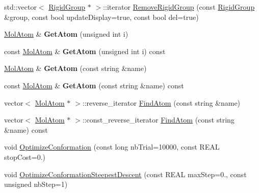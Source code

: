 \begin{DoxyCompactItemize}
std\+::vector$<$ \mbox{\hyperlink{class_obj_cryst_1_1_rigid_group}{Rigid\+Group}} $\ast$ $>$\+::iterator \mbox{\hyperlink{class_obj_cryst_1_1_molecule_ab114397cb6637e26e321fb6f580b2e16}{Remove\+Rigid\+Group}} (const \mbox{\hyperlink{class_obj_cryst_1_1_rigid_group}{Rigid\+Group}} \&group, const bool update\+Display=true, const bool del=true)
\item 
\mbox{\label{class_obj_cryst_1_1_molecule_ab253a45c66991c09a3016b32ee904024}} 
\mbox{\hyperlink{class_obj_cryst_1_1_mol_atom}{Mol\+Atom}} \& {\bfseries Get\+Atom} (unsigned int i)
\item 
\mbox{\label{class_obj_cryst_1_1_molecule_ae39249cfb3fb8e40ac32a0a28b356fde}} 
const \mbox{\hyperlink{class_obj_cryst_1_1_mol_atom}{Mol\+Atom}} \& {\bfseries Get\+Atom} (unsigned int i) const
\item 
\mbox{\label{class_obj_cryst_1_1_molecule_ae1bcdb74c391ae06108cee6c2c73d53b}} 
\mbox{\hyperlink{class_obj_cryst_1_1_mol_atom}{Mol\+Atom}} \& {\bfseries Get\+Atom} (const string \&name)
\item 
\mbox{\label{class_obj_cryst_1_1_molecule_a8f6464483fb210e741f9e92cda123040}} 
const \mbox{\hyperlink{class_obj_cryst_1_1_mol_atom}{Mol\+Atom}} \& {\bfseries Get\+Atom} (const string \&name) const
\item 
vector$<$ \mbox{\hyperlink{class_obj_cryst_1_1_mol_atom}{Mol\+Atom}} $\ast$ $>$\+::reverse\+\_\+iterator \mbox{\hyperlink{class_obj_cryst_1_1_molecule_a7dcd70a612a14005d569322e3030291f}{Find\+Atom}} (const string \&name)
\item 
vector$<$ \mbox{\hyperlink{class_obj_cryst_1_1_mol_atom}{Mol\+Atom}} $\ast$ $>$\+::const\+\_\+reverse\+\_\+iterator \mbox{\hyperlink{class_obj_cryst_1_1_molecule_a671b3e6ab0bf2867632db421237807d7}{Find\+Atom}} (const string \&name) const
\item 
void \mbox{\hyperlink{class_obj_cryst_1_1_molecule_a8e070563a06e9c375b3b26d2e5828c54}{Optimize\+Conformation}} (const long nb\+Trial=10000, const R\+E\+AL stop\+Cost=0.)
\item 
void \mbox{\hyperlink{class_obj_cryst_1_1_molecule_ac275665ed11daea220ef37154b39bf0d}{Optimize\+Conformation\+Steepest\+Descent}} (const R\+E\+AL max\+Step=0., const unsigned nb\+Step=1)
\item 

\end{DoxyCompactItemize}
